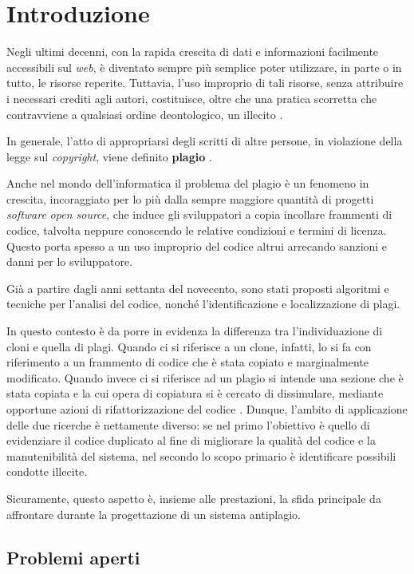\chapter{Introduzione}
Negli ultimi decenni, con la rapida crescita di dati e informazioni facilmente accessibili sul \textit{web}, è diventato sempre più semplice poter utilizzare, in parte o in tutto, le risorse reperite.
%
Tuttavia, l'uso improprio di tali risorse, senza attribuire i necessari crediti agli autori, costituisce, oltre che una pratica scorretta che contravviene a qualsiasi ordine deontologico, un illecito \cite{copyright-law-italia}.

In generale, l'atto di appropriarsi degli scritti di altre persone, in violazione della legge sul \textit{copyright}, viene definito \textbf{plagio} \cite{britannica}.

Anche nel mondo dell'informatica il problema del plagio è un fenomeno in crescita, incoraggiato per lo più dalla sempre maggiore quantità di progetti \textit{software} \textit{open source}, che induce gli sviluppatori a copia incollare frammenti di codice, talvolta neppure conoscendo le relative condizioni e termini di licenza.
%
Questo porta spesso a un uso improprio del codice altrui arrecando sanzioni e danni per lo sviluppatore.

Già a partire dagli anni settanta del novecento, sono stati proposti algoritmi e tecniche per l'analisi del codice, nonché l'identificazione e localizzazione di plagi.

In questo contesto è da porre in evidenza la differenza tra l'individuazione di cloni e quella di plagi.
%
Quando ci si riferisce a un clone, infatti, lo si fa con riferimento a un frammento di codice che è stata copiato e marginalmente modificato. 
%
Quando invece ci si riferisce ad un plagio si intende una sezione che è stata copiata e la cui opera di copiatura si è cercato di dissimulare, mediante opportune azioni di rifattorizzazione del codice \cite{muddu-et-al-2013}.  
%
Dunque, l'ambito di applicazione delle due ricerche è nettamente diverso: se nel primo l'obiettivo è quello di evidenziare il codice duplicato al fine di migliorare la qualità del codice e la manutenibilità del sistema, nel secondo lo scopo primario è identificare possibili condotte illecite.

Sicuramente, questo aspetto è, insieme alle prestazioni, la sfida principale da affrontare durante la progettazione di un sistema antiplagio.

\section{Problemi aperti}

